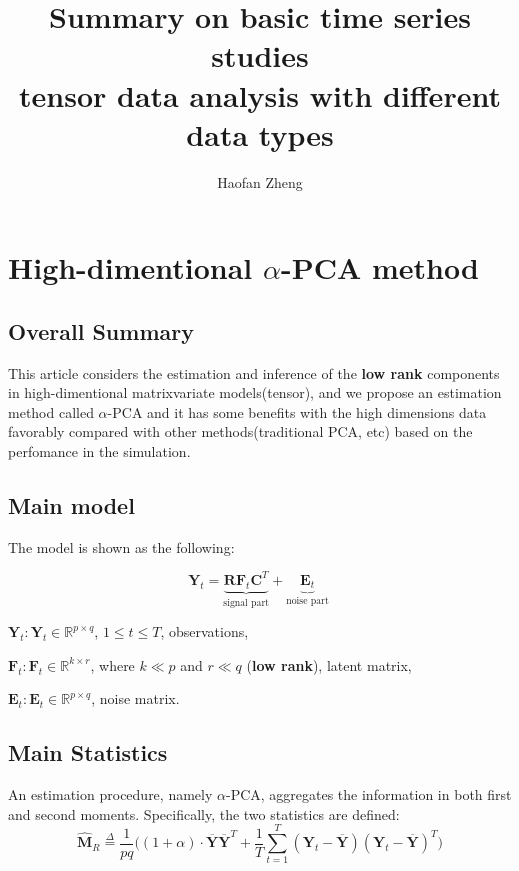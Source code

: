 \documentclass{article}[12pt]
\title{\textbf{Summary on basic time series studies\\ \large tensor data analysis with different data types}}
\author{Haofan Zheng}
\date{}
\begin{document}
\maketitle
\newpage
\tableofcontents
\newpage

\section{High-dimentional $\alpha$-PCA method}

\subsection{Overall Summary}

\noindent This article considers the estimation and inference of the \textbf{low rank} components in high-dimentional matrixvariate models(tensor), and we propose an estimation method called $\alpha$-PCA and it has some benefits with the high dimensions data favorably compared with other methods(traditional PCA, etc) based on the perfomance in the simulation.



\subsection{Main model}\label{section main model 1.2}

\noindent The model is shown as the following:

\begin{equation}
    \mathbf{Y}_t = \underbrace{\mathbf{R}\mathbf{F}_t\mathbf{C}^T}_\text{signal part}+ \underbrace{\mathbf{E}_t}_\text{noise part}\
    \label{expression main model 1.2}
\end{equation}


$\mathbf{Y}_t: \mathbf{Y}_t\in \mathbb{R}^{p\times q}$, $1\leq t \leq T$, observations,

$\mathbf{F}_t: \mathbf{F}_t\in \mathbb{R}^{k\times r}$, where $k\ll p$ and $r\ll q$ (\textbf{low rank}), latent matrix,

$\mathbf{E}_t: \mathbf{E}_t\in \mathbb{R}^{p \times q}$, noise matrix.

\subsection{Main Statistics}\label{section main statistics 1.3}

\noindent An estimation procedure, namely $\alpha$-PCA, aggregates the information in both first and second moments. Specifically, the two statistics are defined:
\begin{equation}
    \mathbf{\widehat{M}}_R  \overset{\Delta}{=} \dfrac{1}{pq}\Bigg((1 + \alpha) \cdot \mathbf{\overline{Y}}\mathbf{\overline{Y}}^T + \dfrac{1}{T}\sum\limits_{t=1}^T(\mathbf{Y}_t - \mathbf{\overline{Y}})(\mathbf{Y}_t - \mathbf{\overline{Y}})^T\Bigg)
    \label{equation statistics MR 1.3}
\end{equation}
\end{document}
